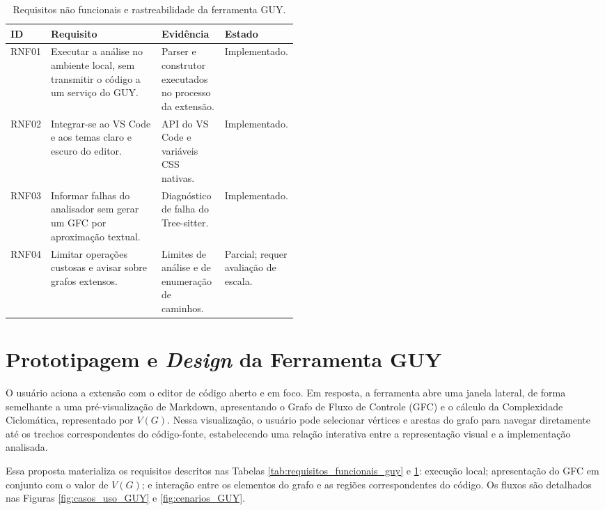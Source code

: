 \begin{table}[H]
    \centering
    \small
    \caption{Requisitos não funcionais e rastreabilidade da ferramenta GUY.}
    \begin{tabularx}{\linewidth}{p{0.10\linewidth} X p{0.22\linewidth} p{0.16\linewidth}}
        \hline
        \textbf{ID} & \textbf{Requisito} & \textbf{Evidência} & \textbf{Estado} \\ \hline
        RNF01 & Executar a análise no ambiente local, sem transmitir o código a um serviço do GUY. & Parser e construtor executados no processo da extensão. & Implementado. \\ \hline
        RNF02 & Integrar-se ao VS Code e aos temas claro e escuro do editor. & API do VS Code e variáveis CSS nativas. & Implementado. \\ \hline
        RNF03 & Informar falhas do analisador sem gerar um GFC por aproximação textual. & Diagnóstico de falha do Tree-sitter. & Implementado. \\ \hline
        RNF04 & Limitar operações custosas e avisar sobre grafos extensos. & Limites de análise e de enumeração de caminhos. & Parcial; requer avaliação de escala. \\ \hline
    \end{tabularx}
    \label{tab:requisitos_nao_funcionais_guy}
\end{table}

\section{Prototipagem e \textit{Design} da Ferramenta GUY}

O usuário aciona a extensão com o editor de código aberto e em foco. Em resposta, a ferramenta abre uma janela lateral, de forma semelhante a uma pré-visualização de Markdown, apresentando o Grafo de Fluxo de Controle (GFC) e o cálculo da Complexidade Ciclomática, representado por \(V(G)\).
Nessa visualização, o usuário pode selecionar vértices e arestas do grafo para navegar diretamente até os trechos correspondentes do código-fonte, estabelecendo uma relação interativa entre a representação visual e a implementação analisada.

Essa proposta materializa os requisitos descritos nas Tabelas \ref{tab:requisitos_funcionais_guy} e \ref{tab:requisitos_nao_funcionais_guy}: execução local; apresentação do GFC em conjunto com o valor de \(V(G)\); e interação entre os elementos do grafo e as regiões correspondentes do código. Os fluxos são detalhados nas Figuras \ref{fig:casos_uso_GUY} e \ref{fig:cenarios_GUY}.


